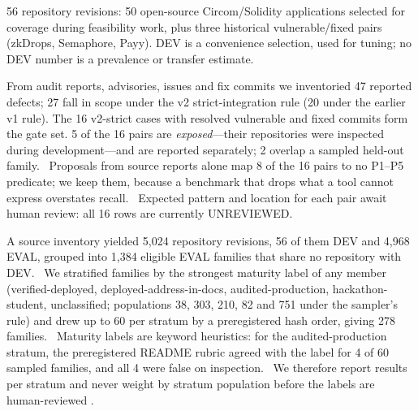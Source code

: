  56 repository revisions: 50 open-source
Circom/Solidity applications selected for coverage during feasibility work,
plus three historical vulnerable/fixed pairs (zkDrops, Semaphore, Payy). DEV is
a convenience selection, used for tuning; no DEV number is a prevalence or
transfer estimate.%

 From audit reports, advisories, issues
and fix commits we inventoried 47 reported defects; 27 fall in scope under the
v2 strict-integration rule (20 under the earlier v1 rule). The 16 v2-strict
cases with resolved vulnerable and fixed commits form the gate set. 5 of the
16 pairs are \emph{exposed}---their repositories were inspected during
development---and are reported separately; 2 overlap a sampled held-out
family.%
\
Proposals from source reports alone map 8 of the 16 pairs to no P1--P5
predicate; we keep them, because a benchmark that drops what a tool cannot
express overstates recall.%
\
Expected pattern and location for each pair await human review: all 16 rows
are currently \textsf{UNREVIEWED}.%

\para{Held-out sample (EVAL).} A source inventory yielded 5,024 repository
revisions, 56 of them DEV and 4,968 EVAL, grouped into 1,384 eligible EVAL
families that share no repository with DEV.%
\
We stratified families by the strongest maturity label of any member
(verified-deployed, deployed-address-in-docs, audited-production,
hackathon-student, unclassified; populations 38, 303, 210, 82 and 751 under
the sampler's rule) and drew up to 60 per stratum by a preregistered hash
order, giving 278 families.%
\
Maturity labels are keyword heuristics: for the audited-production stratum,
the preregistered README rubric agreed with the label for 4 of 60 sampled
families, and all 4 were false on inspection.%
\
We therefore report results per stratum and never weight by stratum
population before the labels are human-reviewed
.

